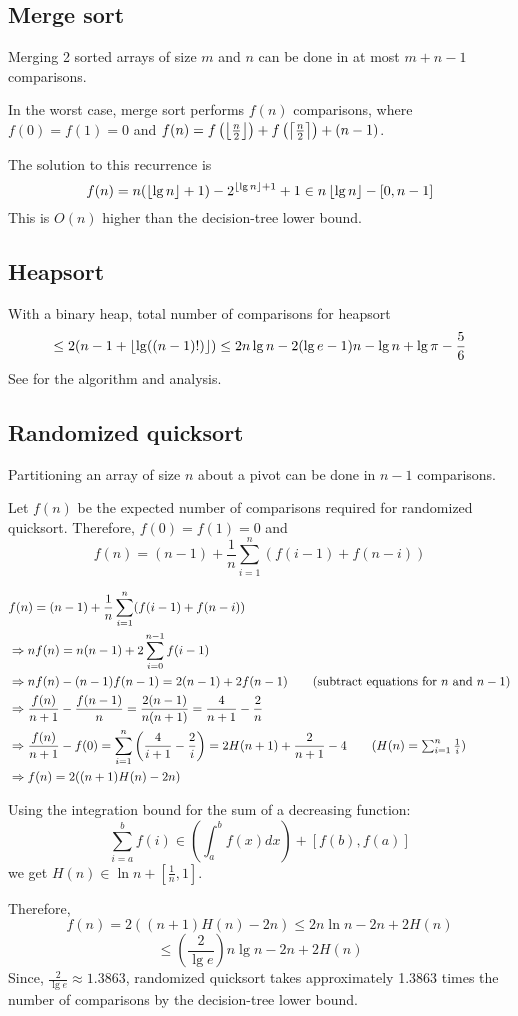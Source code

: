 \subsection{Merge sort}

Merging 2 sorted arrays of size $m$ and $n$ can be done in at most $m + n - 1$ comparisons.

In the worst case, merge sort performs $f(n)$ comparisons, where
$f(0) = f(1) = 0$ and
$f(n) = f\left(\left\lfloor \frac{n}{2} \right\rfloor\right) + f\left(\left\lceil \frac{n}{2} \right\rceil\right) + (n-1)$.

The solution to this recurrence is \cite{eku-notes:recurrences}
\[ f(n)
= n(\left\lfloor \lg n \right\rfloor + 1) - 2^{\left\lfloor \lg n \right\rfloor + 1} + 1
\in n\left\lfloor \lg n \right\rfloor - [0, n-1] \]
This is $O(n)$ higher than the decision-tree lower bound.

\subsection{Heapsort}

With a binary heap, total number of comparisons for heapsort
\[ \le 2(n-1 + \left\lfloor \lg((n-1)!) \right\rfloor) \le 2n\lg n - 2(\lg e - 1)n - \lg n + \lg\pi - \frac{5}{6} \]
See \cite{eku-notes:heaps} for the algorithm and analysis.

\subsection{Randomized quicksort}

Partitioning an array of size $n$ about a pivot can be done in $n-1$ comparisons.

Let $f(n)$ be the expected number of comparisons required for randomized quicksort.
Therefore, $f(0) = f(1) = 0$ and
\[ f(n) = (n-1) + \frac{1}{n} \sum_{i=1}^n (f(i-1) + f(n-i)) \]

\begin{align*}
& f(n) = (n-1) + \frac{1}{n} \sum_{i=1}^n (f(i-1) + f(n-i))
\\ &\Rightarrow nf(n) = n(n-1) + 2 \sum_{i=0}^{n-1} f(i-1)
\\ &\Rightarrow nf(n) - (n-1)f(n-1) = 2(n-1) + 2f(n-1) \tag{subtract equations for $n$ and $n-1$}
\\ &\Rightarrow \frac{f(n)}{n+1} - \frac{f(n-1)}{n}
= \frac{2(n-1)}{n(n+1)} = \frac{4}{n+1} - \frac{2}{n}
\\ &\Rightarrow \frac{f(n)}{n+1} - f(0)
= \sum_{i=1}^n \left( \frac{4}{i+1} - \frac{2}{i} \right)
= 2H(n+1) + \frac{2}{n+1} - 4 \tag{$H(n) = \sum_{i=1}^n \frac{1}{i}$}
\\ &\Rightarrow f(n) = 2((n+1)H(n) - 2n)
\end{align*}

Using the integration bound for the sum of a decreasing function:
\[ \sum_{i=a}^b f(i) \in \left( \int_a^b f(x)dx \right) + [f(b), f(a)] \]
we get $H(n) \in \ln n + \left[ \frac{1}{n}, 1 \right]$.

Therefore,
\[ f(n) = 2((n+1)H(n) - 2n) \le 2n\ln n - 2n + 2H(n) \]
\[ \le \left(\frac{2}{\lg e}\right)n\lg n - 2n + 2H(n) \]
Since, $\frac{2}{\lg e} \approx 1.3863$, randomized quicksort takes
approximately 1.3863 times the number of comparisons by the decision-tree lower bound.

\addMyBib{}



